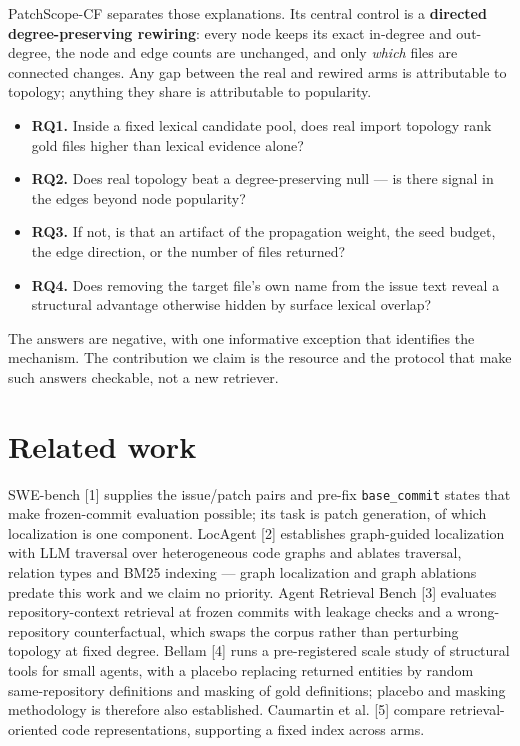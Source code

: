 \documentclass[10pt,a4paper]{article}
\begin{document}
PatchScope-CF separates those explanations. Its central control is a \textbf{directed degree-preserving rewiring}: every node keeps its exact in-degree and out-degree, the node and edge counts are unchanged, and only \textit{which} files are connected changes. Any gap between the real and rewired arms is attributable to topology; anything they share is attributable to popularity.

\begin{itemize}\setlength{\itemsep}{2pt}
\item \textbf{RQ1.} Inside a fixed lexical candidate pool, does real import topology rank gold files higher than lexical evidence alone?
\item \textbf{RQ2.} Does real topology beat a degree-preserving null --- is there signal in the edges beyond node popularity?
\item \textbf{RQ3.} If not, is that an artifact of the propagation weight, the seed budget, the edge direction, or the number of files returned?
\item \textbf{RQ4.} Does removing the target file's own name from the issue text reveal a structural advantage otherwise hidden by surface lexical overlap?
\end{itemize}

The answers are negative, with one informative exception that identifies the mechanism. The contribution we claim is the resource and the protocol that make such answers checkable, not a new retriever.

\section{Related work}
SWE-bench [1] supplies the issue/patch pairs and pre-fix \texttt{base\_commit} states that make frozen-commit evaluation possible; its task is patch generation, of which localization is one component. LocAgent [2] establishes graph-guided localization with LLM traversal over heterogeneous code graphs and ablates traversal, relation types and BM25 indexing --- graph localization and graph ablations predate this work and we claim no priority. Agent Retrieval Bench [3] evaluates repository-context retrieval at frozen commits with leakage checks and a wrong-repository counterfactual, which swaps the corpus rather than perturbing topology at fixed degree. Bellam [4] runs a pre-registered scale study of structural tools for small agents, with a placebo replacing returned entities by random same-repository definitions and masking of gold definitions; placebo and masking methodology is therefore also established. Caumartin et al. [5] compare retrieval-oriented code representations, supporting a fixed index across arms.
\end{document}
